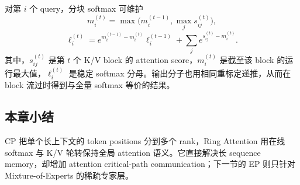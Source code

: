对第 $i$ 个 query，分块 softmax 可维护
\[
m_i^{(t)}=\max\bigl(m_i^{(t-1)},\max_j s_{ij}^{(t)}\bigr),
\]
\[
\ell_i^{(t)}=e^{m_i^{(t-1)}-m_i^{(t)}}\ell_i^{(t-1)}
+\sum_j e^{s_{ij}^{(t)}-m_i^{(t)}}.
\]
其中，$s_{ij}^{(t)}$ 是第 $t$ 个 K/V block 的 attention score，$m_i^{(t)}$ 是截至该 block 的运行最大值，$\ell_i^{(t)}$ 是稳定 softmax 分母。输出分子也用相同重标定递推，从而在 block 流过时得到与全量 softmax 等价的结果。



\subsection{本章小结}

CP 把单个长上下文的 token positions 分到多个 rank，Ring Attention 用在线 softmax 与 K/V 轮转保持全局 attention 语义。它直接解决长 sequence memory，却增加 attention critical-path communication；下一节的 EP 则只针对 Mixture-of-Experts 的稀疏专家层。

